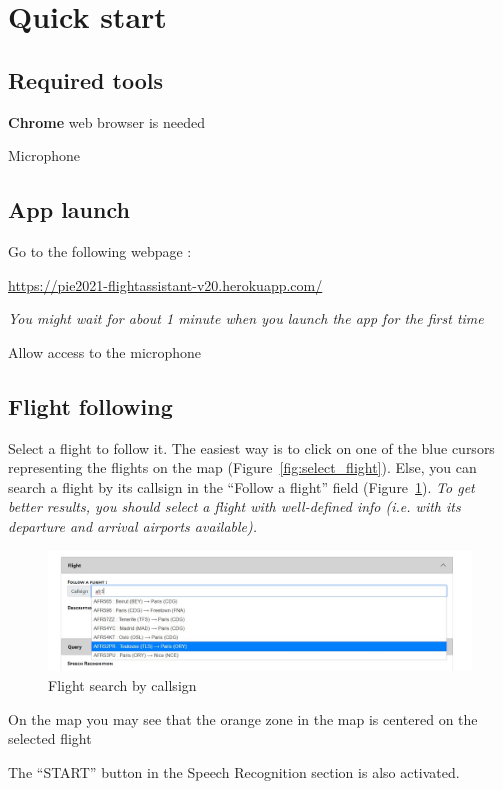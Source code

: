 \documentclass[12pt,oneside,a4]{article}
\let\tempone\itemize
\let\temptwo\enditemize
\renewenvironment{itemize}{\tempone\addtolength{\itemsep}{-0.5\baselineskip}}{\temptwo}
\newcommand{\linkdeploy}{https://pie2021-flightassistant-v20.herokuapp.com/}
\begin{document}
\section{Quick start}

\subsection{Required tools}
\begin{itemize}
    \item \textbf{Chrome} web browser is needed
    \item Microphone
\end{itemize}

\subsection{App launch}
\begin{itemize}
    \item Go to the following webpage : 
    \begin{center}
        \vspace{-.4em}
        \url{\linkdeploy}
    \end{center}
    \textit{You might wait for about 1 minute when you launch the app for the first time}
    \item Allow access to the microphone
\end{itemize}

\subsection{Flight following}

\begin{itemize}
    \item Select a flight to follow it. The easiest way is to click on one of the blue cursors representing the flights on the map (Figure~\ref{fig:select_flight}). 
    Else, you can search a flight by its callsign in the ``Follow a flight'' field (Figure~\ref{fig:search_flight}).
    \textit{To get better results, you should select a flight with well-defined info (i.e. with its departure and arrival airports available).}
    
    \begin{figure}[h!]
        \centering
        \includegraphics[width=.9\linewidth]{search_flight.jpg}
        \caption{Flight search by callsign}
        \label{fig:search_flight}
    \end{figure}
    \item On the map you may see that the orange zone in the map is centered on the selected flight
    \item The ``START'' button in the Speech Recognition section is also activated.
\end{itemize}
\end{document}
